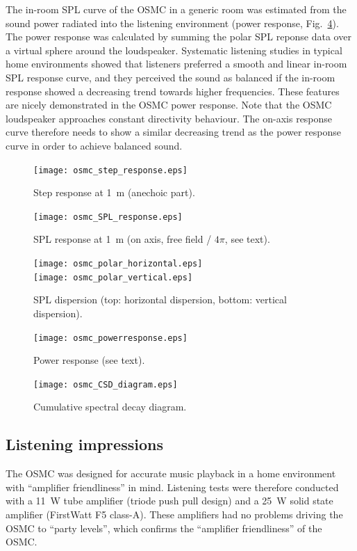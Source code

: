\documentclass[12pt,a4paper]{article}
\providecommand{\figr}[1]{Fig.~\ref{fig:#1}}
\providecommand{\figlabel}[1]{\label{fig:#1}}
\begin{document}
The in-room SPL curve of the OSMC in a generic room was estimated from the sound power radiated into the listening environment (power response, \figr{osmc_powerresponse}). The power response was calculated by summing the polar SPL reponse data over a virtual sphere around the loudspeaker.\cite{tylka,mat_lspr} Systematic listening studies in typical home environments showed that listeners preferred a smooth and linear in-room SPL response curve, and they perceived the sound as balanced if the in-room response showed a decreasing trend towards higher frequencies.\cite{osmc_p915} These features are nicely demonstrated in the OSMC power response. Note that the OSMC loudspeaker approaches constant directivity behaviour. The on-axis response curve therefore needs to show a similar decreasing trend as the power response curve in order to achieve balanced sound.


\begin{figure}[p]
	\centering
	\texttt{[image: osmc\_step\_response.eps]}
	\caption{Step response at \SI{1}{m} (anechoic part).}
	\figlabel{osmc_step_response}
\end{figure}

\begin{figure}[p]
	\centering
	\texttt{[image: osmc\_SPL\_response.eps]}
	\caption{SPL response at \SI{1}{m} (on axis, free field / $4\pi$, see text).}
	\figlabel{osmc_SPL_response}
\end{figure}

\begin{figure}[p]
	\centering
	\texttt{[image: osmc\_polar\_horizontal.eps]}\\
	\texttt{[image: osmc\_polar\_vertical.eps]}
	\caption{SPL dispersion (top: horizontal dispersion, bottom: vertical dispersion).}
	\figlabel{osmc_polar}
\end{figure}

\begin{figure}[p]
	\centering
	\texttt{[image: osmc\_powerresponse.eps]}
	\caption{Power response (see text).}
	\figlabel{osmc_powerresponse}
\end{figure}

\begin{figure}[p]
	\centering
	\texttt{[image: osmc\_CSD\_diagram.eps]}
	\caption{Cumulative spectral decay diagram.}
	\figlabel{osmc_CSD_diagram}
\end{figure}


\clearpage


\subsection{Listening impressions}
The OSMC was designed for accurate music playback in a home environment with ``amplifier friendliness'' in mind. Listening tests were therefore conducted with a \SI{11}{W} tube amplifier (triode push pull design) and a \SI{25}{W} solid state amplifier (FirstWatt F5 class-A). These amplifiers had no problems driving the OSMC to ``party levels'', which confirms the ``amplifier friendliness'' of the OSMC.\par
\end{document}
